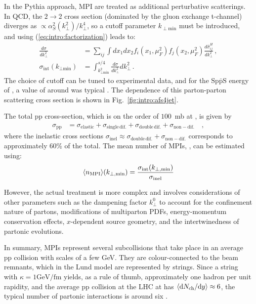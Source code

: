 In the Pythia approach, MPI are treated as additional perturbative scatterings. In QCD, the $2\to2$ cross section (dominated by the gluon exchange t-channel) diverges as $\propto \alpha^2_S(k_{\perp}^2)/k_{\perp}^4$, so a cutoff parameter $k_{\perp\mathrm{min}}$ must be introduced, and using (\ref{eq:intro:factorization}) leads to:
\begin{align}
\frac{d\sigma}{dk_{\perp}^2} &= \sum_{ij}\int dx_1 dx_2 f_i(x_1,\mu_F^2)f_j(x_2,\mu_F^2) \frac{d\hat{\sigma}^H_{ij}}{dk_{\perp}^2} \, , \\
\sigma_{\text{int}}(k_{\perp\text{min}}) &= \int_{k_{\perp\text{min}}^2}^{s/4} \frac{d\sigma}{dk_{\perp}^2}dk_{\perp}^2 \, .
\end{align}
The choice of cutoff can be tuned to experimental data, and for the $\mathrm{Sp\bar{p}S}$ energy of , a value of around  was typical \cite{sjostrandDevelopmentMPIModelling2017}. The dependence of this parton-parton scattering cross section is shown in Fig.~\ref{fig:intro:afs4jet}.

The total pp cross-section, which is on the order of $100$~mb at , is given by
\begin{align}
\sigma_{\mathrm{pp}} &= \sigma_{\mathrm{elastic}} + \sigma_{\mathrm{single \, dif.}} + \sigma_{\mathrm{double \, dif.}} + \sigma_{\mathrm{non-dif.}} \quad , 
\end{align}
where the inelastic cross sections $\sigma_\mathrm{inel} \approx \sigma_{\mathrm{double \, dif.}} + \sigma_{\mathrm{non-dif.}}$ corresponds to approximately 60\% of the total. The mean number of MPIs, \meannmpi, can be estimated using:
\begin{align}
\langle n_{\rm MPI} \rangle (k_{\perp,\mathrm{min}}) = \frac{\sigma_{\mathrm{int}}(k_{\perp,\mathrm{min}})}{\sigma_{\mathrm{inel}}}
\end{align}

However, the actual treatment is more complex and involves considerations of other parameters such as the dampening factor $k_\perp^0$ to account for the confinement nature of partons, modifications of multiparton PDFs, energy-momentum conservation effects, $x$-dependent source geometry, and the intertwinedness of partonic evolutions.


In summary, MPIs represent several subcollisions that take place in an average pp collision with \pt scales of a few GeV. They are colour-connected to the beam remnants, which in the Lund model are represented by strings. Since a string with $\kappa = 1 \mathrm{GeV} /\mathrm{fm}$ yields, as a rule of thumb, approximately one hadron per unit rapidity, and the average pp collision at the LHC at  has $\langle \mathrm{d}N_\mathrm{ch}/\mathrm{d}y \rangle \approx 6$, the typical number of partonic interactions is around six \cite{sjostrandDevelopmentMPIModelling2017}.

